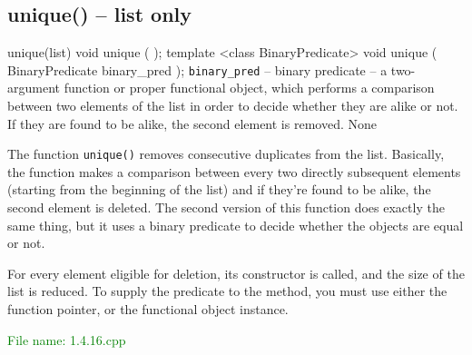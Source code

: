 
\subsection{unique() – list only} %
\begin{methodinfo}
  {unique(list)}
  {void unique ( ); 
  template <class BinaryPredicate> 
    void unique ( BinaryPredicate binary_pred );}
  {\texttt{binary\_pred} – binary predicate – a two-argument function or proper functional object, 
  which performs a comparison between two elements of the list in order to decide whether 
  they are alike or not. If they are found to be alike, the second element is removed.}
  {None}
  {The function \texttt{unique()} removes consecutive duplicates from the list. Basically, 
  the function makes a comparison between every two directly subsequent elements (starting from 
  the beginning of the list) and if they’re found to be alike, the second element is deleted. 
  The second version of this function does exactly the same thing, but it uses a binary predicate to 
  decide whether the objects are equal or not.

  For every element eligible for deletion, its constructor  is called, and the size of the list is 
  reduced. To supply the predicate to the method, you must use either the function pointer, or 
  the functional object instance.}
\end{methodinfo}

\textcolor{green}{File name: 1.4.16.cpp}

